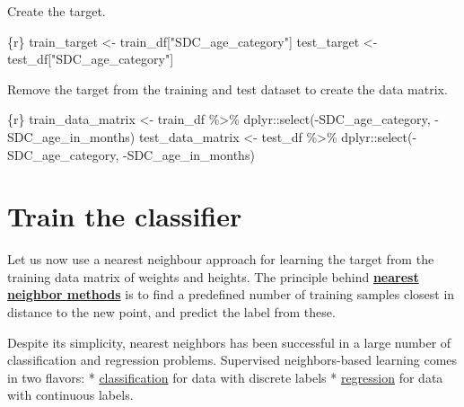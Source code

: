 \documentclass[
  letterpaper,
  DIV=11,
  numbers=noendperiod,
  oneside]{scrreprt}
\newenvironment{Shaded}{\begin{snugshade}}{\end{snugshade}}
\newcommand{\FunctionTok}[1]{\textcolor[rgb]{0.28,0.35,0.67}{#1}}
\newcommand{\InformationTok}[1]{\textcolor[rgb]{0.37,0.37,0.37}{#1}}
\newcommand{\NormalTok}[1]{\textcolor[rgb]{0.00,0.23,0.31}{#1}}
\newcommand{\OtherTok}[1]{\textcolor[rgb]{0.00,0.23,0.31}{#1}}
\newcommand{\SpecialCharTok}[1]{\textcolor[rgb]{0.37,0.37,0.37}{#1}}
\newcommand{\StringTok}[1]{\textcolor[rgb]{0.13,0.47,0.30}{#1}}
\begin{document}
Create the target.

\begin{Shaded}
\begin{Highlighting}[]
\InformationTok{\textasciigrave{}\textasciigrave{}\textasciigrave{}\{r\}}
\NormalTok{train\_target }\OtherTok{\textless{}{-}}\NormalTok{ train\_df[}\StringTok{"SDC\_age\_category"}\NormalTok{] }
\NormalTok{test\_target }\OtherTok{\textless{}{-}}\NormalTok{ test\_df[}\StringTok{"SDC\_age\_category"}\NormalTok{] }
\InformationTok{\textasciigrave{}\textasciigrave{}\textasciigrave{}}
\end{Highlighting}
\end{Shaded}

Remove the target from the training and test dataset to create the data
matrix.

\begin{Shaded}
\begin{Highlighting}[]
\InformationTok{\textasciigrave{}\textasciigrave{}\textasciigrave{}\{r\}}
\NormalTok{train\_data\_matrix }\OtherTok{\textless{}{-}}\NormalTok{ train\_df }\SpecialCharTok{\%\textgreater{}\%}
\NormalTok{  dplyr}\SpecialCharTok{::}\FunctionTok{select}\NormalTok{(}\SpecialCharTok{{-}}\NormalTok{SDC\_age\_category,}
                \SpecialCharTok{{-}}\NormalTok{SDC\_age\_in\_months)}
\NormalTok{test\_data\_matrix }\OtherTok{\textless{}{-}}\NormalTok{ test\_df }\SpecialCharTok{\%\textgreater{}\%}
\NormalTok{  dplyr}\SpecialCharTok{::}\FunctionTok{select}\NormalTok{(}\SpecialCharTok{{-}}\NormalTok{SDC\_age\_category,}
                \SpecialCharTok{{-}}\NormalTok{SDC\_age\_in\_months)}
\InformationTok{\textasciigrave{}\textasciigrave{}\textasciigrave{}}
\end{Highlighting}
\end{Shaded}

\hypertarget{train-the-classifier}{%
\section{Train the classifier}\label{train-the-classifier}}

Let us now use a nearest neighbour approach for learning the target from
the training data matrix of weights and heights. The principle behind
\href{https://scikit-learn.org/stable/modules/classes.html\#module-sklearn.neighbors}{\textbf{nearest
neighbor methods}} is to find a predefined number of training samples
closest in distance to the new point, and predict the label from these.

Despite its simplicity, nearest neighbors has been successful in a large
number of classification and regression problems. Supervised
neighbors-based learning comes in two flavors: *
\href{https://scikit-learn.org/stable/modules/neighbors.html\#classification}{classification}
for data with discrete labels *
\href{https://scikit-learn.org/stable/modules/neighbors.html\#regression}{regression}
for data with continuous labels.
\end{document}
